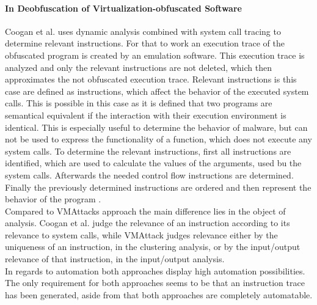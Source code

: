 \documentclass[10pt,twoside,a4paper,bibliography=totoc]{scrbook}
\begin{document}
\paragraph*{In Deobfuscation of Virtualization-obfuscated Software}Coogan et al. uses dynamic analysis combined with system call tracing to determine relevant instructions. 
For that to work an execution trace of the obfuscated program is created by an emulation software. 
This execution trace is analyzed and only the relevant instructions are not deleted, which then approximates the not obfuscated execution trace. Relevant instructions is this case are defined as instructions, which affect the behavior of the executed system calls. 
This is possible in this case as it is defined that two programs are semantical equivalent if the interaction with their execution environment is identical. 
This is especially useful to determine the behavior of malware, but can not be used to express the functionality of a function, which does not execute any system calls. 
To determine the relevant instructions, first all instructions are identified, which are used to calculate the values of the arguments, used bu the system calls. 
Afterwards the needed control flow instructions are determined. Finally the previously determined instructions are ordered and then represent the behavior of the program \cite{Coogan:2011:DVS:2046707.2046739}.\\
Compared to VMAttacks approach the main difference lies in the object of analysis. Coogan et al. judge the relevance of an instruction according to its relevance to system calls, while VMAttack judges relevance either by the uniqueness of an instruction, in the clustering analysis, or by the input/output relevance of that instruction, in the input/output analysis. \\
In regards to automation both approaches display high automation possibilities. The only requirement for both approaches seems to be that an instruction trace has been generated, aside from that both approaches are completely automatable.
\end{document}
